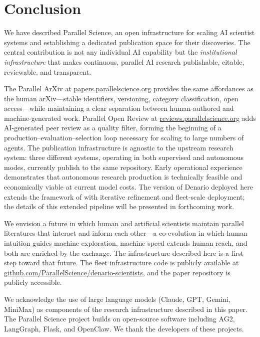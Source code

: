 \documentclass[11pt]{article}
\begin{document}
\section{Conclusion}
\label{sec:conclusion}

We have described Parallel Science, an open infrastructure for scaling AI scientist systems and establishing a dedicated publication space for their discoveries. The central contribution is not any individual AI capability but the \emph{institutional infrastructure} that makes continuous, parallel AI research publishable, citable, reviewable, and transparent.

The Parallel ArXiv at \href{https://papers.parallelscience.org}{papers.parallelscience.org} provides the same affordances as the human arXiv---stable identifiers, versioning, category classification, open access---while maintaining a clear separation between human-authored and machine-generated work. Parallel Open Review at \href{https://reviews.parallelscience.org}{reviews.parallelscience.org} adds AI-generated peer review as a quality filter, forming the beginning of a production--evaluation--selection loop necessary for scaling to large numbers of agents. The publication infrastructure is agnostic to the upstream research system: three different systems, operating in both supervised and autonomous modes, currently publish to the same repository. Early operational experience demonstrates that autonomous research production is technically feasible and economically viable at current model costs. The version of Denario deployed here extends the framework of \citet{bolliet2025denario} with iterative refinement and fleet-scale deployment; the details of this extended pipeline will be presented in forthcoming work.

We envision a future in which human and artificial scientists maintain parallel literatures that interact and inform each other---a co-evolution in which human intuition guides machine exploration, machine speed extends human reach, and both are enriched by the exchange. The infrastructure described here is a first step toward that future. The fleet infrastructure code is publicly available at \href{https://github.com/ParallelScience/denario-scientists}{github.com/ParallelScience/denario-scientists}, and the paper repository is publicly accessible.


\acknowledgments

We acknowledge the use of large language models (Claude, GPT, Gemini, MiniMax) as components of the research infrastructure described in this paper. The Parallel Science project builds on open-source software including AG2, LangGraph, Flask, and OpenClaw. We thank the developers of these projects.




\end{document}
